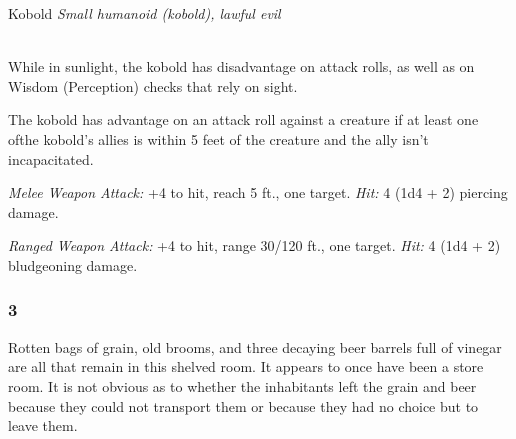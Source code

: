 \documentclass[palace_of_the_silver_princess]{subfiles}
\begin{document}
\begin{monsterbox}{Kobold}
    \textit{Small humanoid (kobold), lawful evil}\\
    \hline
    \basics[%
        armorclass = 12,
        hitpoints  = 5 (2d6 - 2),
        speed      = 30 ft.
    ]
    \hline
    \stats[
        STR = \stat{7},
        DEX = \stat{15},
        CON = \stat{9},
        INT = \stat{8},
        WIS = \stat{7},
        CHA = \stat{8}
    ]
    \hline
    \details[
        senses = {darkvision 60 ft., passive Perception 8},
        languages = {Common, Draconic},
        challenge = {1/8 (25 XP)},
    ]
    \hline
    \\[1mm]
    \begin{monsteraction}
        While in sunlight, the kobold has disadvantage on attack rolls,
        as well as on Wisdom (Perception) checks that rely on sight.
    \end{monsteraction}

    \begin{monsteraction}
        The kobold has advantage on an attack roll against a creature
        if at least one ofthe kobold's allies is within 5 feet of the
        creature and the ally isn't incapacitated.
    \end{monsteraction}
     \begin{monsteraction}[Dagger]
         \textit{Melee Weapon Attack:} +4 to hit, reach 5 ft., one target.
         \textit{Hit:} 4 (1d4 + 2) piercing damage.
     \end{monsteraction}

     \begin{monsteraction}[Sling]
         \textit{Ranged Weapon Attack:} +4 to hit, range 30/120 ft.,
         one target. 
         \textit{Hit:} 4 (1d4 + 2) bludgeoning damage.
     \end{monsteraction}
\end{monsterbox}

\subsubsection{3}

\begin{quotebox}
    Rotten bags of grain, old brooms, and three decaying beer barrels
    full of vinegar are all that remain in this shelved room. It appears
    to once have been a store room. It is not obvious as to whether the
    inhabitants left the grain and beer because they could not transport
    them or because they had no choice but to leave them.
\end{quotebox}
\end{document}
